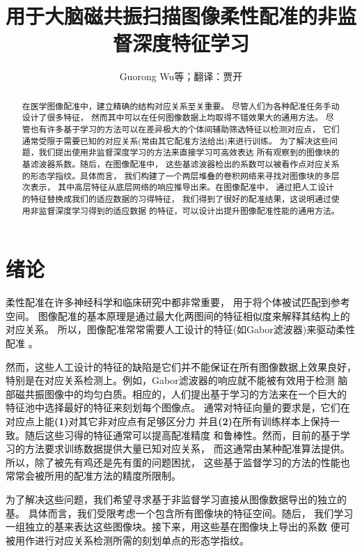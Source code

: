 \documentclass[a4paper]{article}
\title{用于大脑磁共振扫描图像柔性配准的非监督深度特征学习}
\date{}
\author{Guorong Wu等；翻译：贾开}
\numberwithin{equation}{section}
\begin{document}
\maketitle
\begin{abstract}
    在医学图像配准中，建立精确的结构对应关系至关重要。
    尽管人们为各种配准任务手动设计了很多特征，
    然而其中可以在任何图像数据上均取得不错效果大的通用方法。
    尽管也有许多基于学习的方法可以在差异极大的个体间辅助筛选特征以检测对应点，
    它们通常受限于需要已知的对应关系(常由其它配准方法给出)来进行训练。
    为了解决这些问题，我们提出使用非监督深度学习的方法来直接学习可高效表达
    所有观察到的图像块的基滤波器系数。随后，在图像配准中，
    这些基滤波器检出的系数可以被看作点对应关系的形态学指纹。具体而言，
    我们构建了一个两层堆叠的卷积网络来寻找对图像块的多层次表示，
    其中高层特征从底层网络的响应推导出来。在图像配准中，
    通过把人工设计的特征替换成我们的适应数据的习得特征，
    我们得到了很好的配准结果，这说明通过使用非监督深度学习得到的适应数据
    的特征，可以设计出提升图像配准性能的通用方法。
\end{abstract}

\section{绪论}
柔性配准在许多神经科学和临床研究中都非常重要，
用于将个体被试匹配到参考空间\cite{zitova2003image,vercauteren2009diffeomorphic}。
图像配准的基本原理是通过最大化两图间的特征相似度来解释其结构上的对应关系。
所以，图像配准常常需要人工设计的特征(如Gabor滤波器)来驱动柔性配准
\cite{liu2002local}。

然而，这些人工设计的特征的缺陷是它们并不能保证在所有图像数据上效果良好，
特别是在对应关系检测上。例如，Gabor滤波器的响应就不能被有效用于检测
脑部磁共振图像中的均匀白质。相应的，人们提出基于学习的方法来在一个巨大的
特征池中选择最好的特征来刻划每个图像点\cite{ou2011dramms,wu2006learning}。
通常对特征向量的要求是，它们在对应点上能{\bf (1)}对其它非对应点有足够区分力
并且{\bf (2)}在所有训练样本上保持一致。随后这些习得的特征通常可以提高配准精度
和鲁棒性。然而，目前的基于学习的方法要求训练数据提供大量已知对应关系，
而这通常由某种配准算法提供。所以，除了被先有鸡还是先有蛋的问题困扰，
这些基于监督学习的方法的性能也常常会被所用的配准方法的精度所限制。

为了解决这些问题，我们希望寻求基于非监督学习直接从图像数据导出的独立的基。
具体而言，我们受限考虑一个包含所有图像块的特征空间。随后，
我们学习一组独立的基来表达这些图像块。接下来，用这些基在图像块上导出的系数
便可被用作进行对应关系检测所需的刻划单点的形态学指纹。
\end{document}

